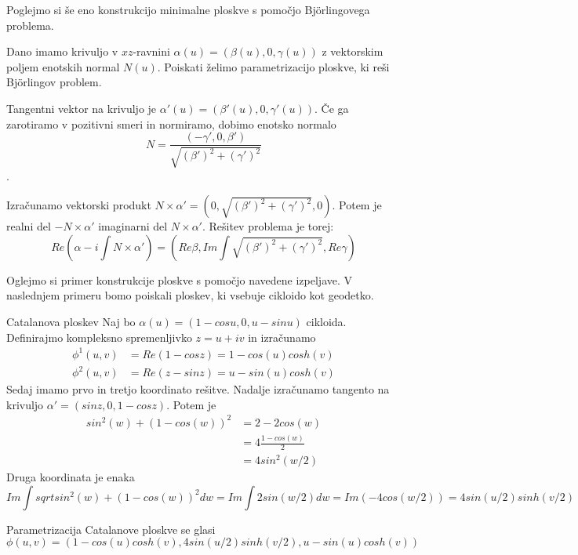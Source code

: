 \documentclass[mat1]{fmfdelo}
\begin{document}
Poglejmo si še eno konstrukcijo minimalne ploskve s pomočjo Björlingovega problema.


Dano imamo krivuljo v $xz$-ravnini $\alpha (u) = \left( \beta (u), 0, \gamma (u) \right)$ z vektorskim 
poljem enotskih normal $N (u)$. Poiskati želimo parametrizacijo ploskve, ki reši Björlingov problem.

Tangentni vektor na krivuljo je $\alpha' (u) = \left( \beta' (u), 0, \gamma' (u) \right)$. Če ga zarotiramo
v pozitivni smeri in normiramo, dobimo enotsko normalo 
$$N = \frac{ \left( - \gamma', 0, \beta' \right) }{ \sqrt{(\beta')^2 + (\gamma')^2 }} $$.

Izračunamo vektorski produkt $N \times \alpha' = \left( 0, \sqrt{(\beta')^2 + (\gamma')^2}, 0 \right)$. 
Potem je realni del $- N \times \alpha'$ imaginarni del $N \times \alpha'$. Rešitev problema je torej:
$$ Re \left( \alpha - i \int N \times \alpha' \right) = \left( Re \beta, Im \int \sqrt{(\beta')^2 + (\gamma')^2}, Re \gamma \right)$$


Oglejmo si primer konstrukcije ploskve s pomočjo navedene izpeljave. V naslednjem primeru bomo poiskali
ploskev, ki vsebuje cikloido kot geodetko.

\begin{primer}{Catalanova ploskev}
    Naj bo $\alpha (u) = \left( 1 - cos u , 0, u - sin u \right)$ cikloida.
    Definirajmo kompleksno spremenljivko $z = u + i v$ in izračunamo
    \begin{align*}
        \phi^1 (u, v) &= Re (1 - cos z) = 1 - cos (u) cosh (v) \\
        \phi^2 (u, v) &= Re (z - sin z) = u - sin (u) cosh (v)
    \end{align*}
    Sedaj imamo prvo in tretjo koordinato rešitve.
    Nadalje izračunamo tangento na krivuljo $\alpha' = \left( sin z, 0, 1 - cos z \right)$. Potem je
    \begin{align*}
        sin^2 (w) + (1 - cos (w))^2 &= 2 - 2 cos(w) \\
        &= 4 \frac{1 - cos (w)}{2} \\
        &= 4 sin^2 (w/2)
    \end{align*}
    Druga koordinata je enaka
    $$ Im \int sqrt{sin^2 (w) + (1 - cos (w))^2} dw = Im \int 2 sin(w/2) dw = Im \left(- 4 cos(w/2) \right) = 4 sin(u/2) sinh(v/2)$$

    Parametrizacija Catalanove ploskve se glasi
    $$\phi (u, v) = \left( 1 - cos (u) cosh (v), 4 sin(u/2) sinh(v/2), u - sin (u) cosh (v) \right)$$
\end{primer}
\end{document}
